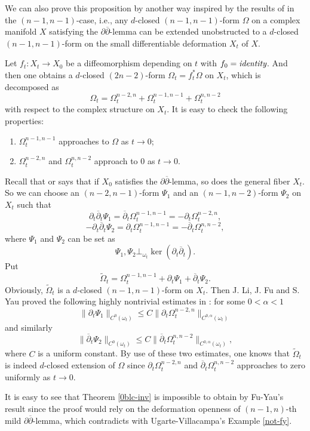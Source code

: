 \documentclass[12pt]{amsart}
\numberwithin{equation}{section}
\renewcommand{\1}{\mathds{1}}
\newcommand{\db}{\overline{\partial}}
\newcommand{\Om}{\Omega}
\newcommand{\om}{\omega}
\renewcommand{\>}{\rightarrow}
\newcommand{\p}{\partial}
\def\p{\partial}
\def\om{\omega}
\begin{document}
We can also prove this proposition by another way inspired by the
results of \cite{au,FY,w} in the $(n-1,n-1)$-case, i.e., any
$d$-closed $(n-1,n-1)$-form $\Omega$ on a complex manifold $X$
satisfying the $\p\db$-lemma can be extended unobstructed to a
$d$-closed $(n-1,n-1)$-form on the
small differentiable deformation $X_t$
of $X$.

Let $f_t: X_t\rightarrow X_0$ be a diffeomorphism depending on $t$
with $f_0= \emph{identity}$. And then one obtains a $d$-closed
$(2n-2)$-form $\Om_t=f_t^*\Om$ on $X_t$, which is decomposed as
$$\Om_t=\Om_t^{n-2,n}+\Om_t^{n-1,n-1}+\Om_t^{n,n-2}$$
with respect to the complex structure on $X_t$. It is easy to check
the following properties:

\begin{enumerate}[$(1)$]
    \item \label{appom}
$\Om_t^{n-1,n-1}$ approaches to $\Omega$ as $t\rightarrow 0$;

    \item \label{appo}
$\Om_t^{n-2,n}$ and $\Om_t^{n,n-2}$ approach to 0 as $t\rightarrow
0$.
 \end{enumerate}

Recall that \cite[Theomem 5.12]{w} or \cite[Corollary 3.7]{at} says
that if $X_0$ satisfies the $\p\db$-lemma, so does the general fiber
$X_t$. So we can choose an $(n-2,n-1)$-form $\Psi_1$ and an
$(n-1,n-2)$-form $\Psi_2$ on $X_t$ such that
$$\p_t\db_t \Psi_1=\db_t \Om_t^{n-1,n-1}=-\p_t \Om_t^{n-2,n},$$
$$-\p_t\db_t \Psi_2=\p_t \Om_t^{n-1,n-1}=-\db_t \Om_t^{n,n-2},$$
where $\Psi_1$ and $\Psi_2$ can be set as
$$\Psi_1,\Psi_2\bot_{\om_t} \ker(\p_t\db_t).$$
 Put
$$\widetilde{\Om}_t=\Om_t^{n-1,n-1}+ \p_t\Psi_1+\db_t
\Psi_2.$$ Obviously, $\widetilde{\Om}_t$ is a $d$-closed
$(n-1,n-1)$-form on $X_t$. Then J. Li, J. Fu and S. Yau proved the
following highly nontrivial estimates in \cite[Sections $4$ and
$5$]{FLY}: for some $0<\alpha<1$
$$\|\p_t\Psi_1\|_{C^0(\om_t)}\leq C\|\p_t \Om_t^{n-2,n}\|_{C^{0,\alpha}(\om_t)}$$
and similarly
$$\|\db_t
\Psi_2\|_{C^0(\om_t)}\leq C\|\db_t
\Om_t^{n,n-2}\|_{C^{0,\alpha}(\om_t)},$$ where $C$ is a uniform
constant. By use of these two estimates, one knows that
$\widetilde{\Om}_t$ is indeed $d$-closed extension of $\Om$ since
$\p_t \Om_t^{n-2,n}$ and $\db_t\Om_t^{n,n-2}$ approaches to zero
uniformly as $t\rightarrow 0$.

It is easy to see that Theorem \ref{0blc-inv} is impossible to
obtain by Fu-Yau's result since the proof would rely on the
deformation openness of $(n-1,n)$-th mild $\p\db$-lemma, which
contradicts with Ugarte-Villacampa's Example \ref{not-fy}.
\end{document}

